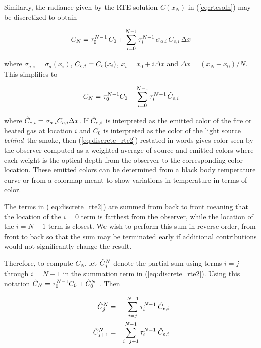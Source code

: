 Similarly, the radiance given by the RTE solution $C(x_N)$ in (\ref{eq:rtesoln}) may be discretized to obtain

\begin{eqnarray*}
C_{N} = \tau_{0}^{N-1}\,C_0 +
\sum_{i=0}^{N-1}\tau_{i}^{N-1}\,\sigma_{a,i}\,C_{e,i}\,\Delta x
\end{eqnarray*}

where $\sigma_{a,i}=\sigma_a(x_i)$, $C_{e,i}=C_e(x_i)$, $x_i=x_0+i\Delta x$ and $\Delta x=(x_N-x_0)/N$.
This simplifies to

\begin{equation}
\label{eq:discrete_rte2}
C_N = \tau_{0}^{N-1}C_0 + \sum_{i=0}^{N-1}\tau_{i}^{N-1}\,\hat{C}_{e,i}
\end{equation}

where $\hat{C}_{e,i}=\sigma_{a,i}C_{e,i}\Delta x$.  If $\hat{C}_{e,i}$ is interpreted as the emitted color of the fire or heated gas at location $i$ and $C_0$ is interpreted as the color  of the light source {\em behind}\ the smoke, then (\ref{eq:discrete_rte2}) restated in words gives color seen by the observer computed as a weighted average of source and emitted colors where each weight is the optical depth from the observer to the corresponding color location.  These emitted colors can be determined from a black body temperature curve or from a colormap meant to show variations in temperature in terms of color.


The terms in (\ref{eq:discrete_rte2}) are summed from back to front meaning that the location of the $i=0$ term is farthest from the observer, while the location of the $i=N-1$ term is closest.  We wish to perform this sum in reverse order, from front to back so that the sum may be terminated early if additional contributions would not significantly change the result.

Therefore, to compute $C_N$, let $\hat{C}_{j}^N$ denote the partial sum using terms $i=j$ through $i=N-1$ in the summation term in (\ref{eq:discrete_rte2}).  Using this notation $\hat{C}_N=\tau_{0}^{N-1}C_0+\hat{C}_{0}^N$ . Then

\begin{eqnarray}
\label{eq:recurse1}
\hat{C}_{j}^N &= &\sum_{i=j}^{N-1}\tau_{i}^{N-1}\,\hat{C}_{e,i}\\
\label{eq:recurse2}
\hat{C}_{j+1}^N     &= &\sum_{i=j+1}^{N-1}  \tau_{i}^{N-1}\,\hat{C}_{e,i}
\end{eqnarray}

